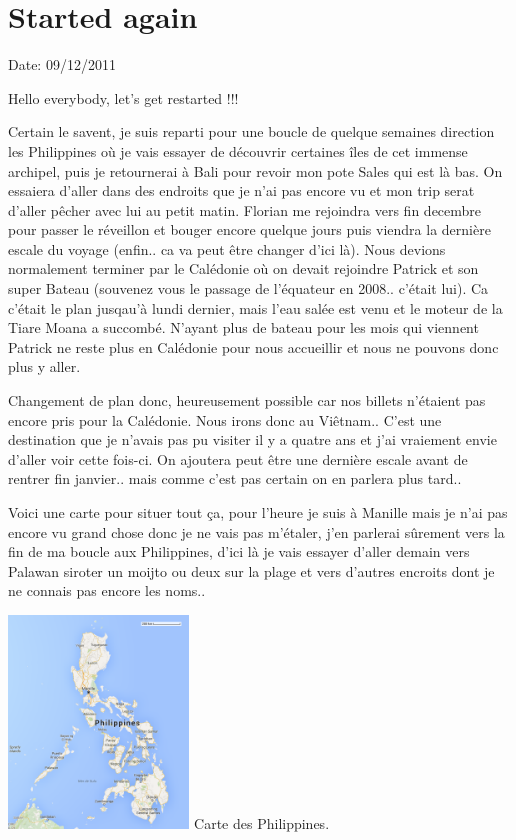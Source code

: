 \section{Started again}

Date: 09/12/2011

\begin{multicols}{2}

Hello everybody, let's get restarted !!!

Certain le savent, je suis reparti pour une boucle de quelque semaines direction les Philippines où je vais essayer de découvrir certaines îles de cet immense archipel, puis je retournerai à Bali pour revoir mon pote Sales qui est là bas. On essaiera d'aller dans des endroits que je n'ai pas encore vu et mon trip serat d'aller pêcher avec lui au petit matin. Florian me rejoindra vers fin decembre pour passer le réveillon et bouger encore quelque jours puis viendra la dernière escale du voyage (enfin.. ca va peut être changer d'ici là). Nous devions normalement terminer par le Calédonie où on devait rejoindre Patrick et son super Bateau (souvenez vous le passage de l'équateur en 2008.. c'était lui). Ca c'était le plan jusqau'à lundi dernier, mais l'eau salée est venu et le moteur de la Tiare Moana a succombé. N'ayant plus de bateau pour les mois qui viennent Patrick ne reste plus en Calédonie pour nous accueillir et nous ne pouvons donc plus y aller.

Changement de plan donc, heureusement possible car nos billets n'étaient pas encore pris pour la Calédonie. Nous irons donc au Viêtnam.. C'est une destination que je n'avais pas pu visiter il y a quatre ans et j'ai vraiement envie d'aller voir cette fois-ci. On ajoutera peut être une dernière escale avant de rentrer fin janvier.. mais comme c'est pas certain on en parlera plus tard..

Voici une carte pour situer tout ça, pour l'heure je suis à Manille mais je n'ai pas encore vu grand chose donc je ne vais pas m'étaler, j'en parlerai sûrement vers la fin de ma boucle aux Philippines, d'ici là je vais essayer d'aller demain vers Palawan siroter un moijto ou deux sur la plage et vers d'autres encroits dont je ne connais pas encore les noms..

\hspace*{-0.65cm}
\includegraphics[width=4.8cm]{articles/Started-again/philippines.png}
Carte des Philippines.


\end{multicols}
